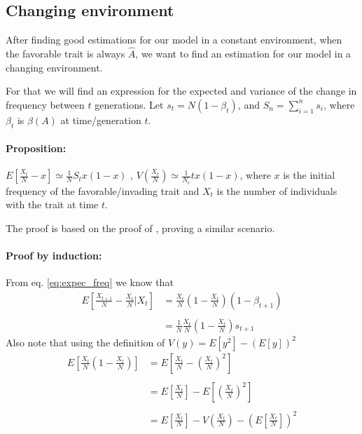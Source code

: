 \documentclass[11pt]{article}
\begin{document}
\subsection{Changing environment}
After finding good estimations for our model in a constant environment, when the favorable trait is always $\hat{A}$, we want to find an estimation for our model in a changing environment.

For that we will find an expression for the expected and variance of the change in frequency between $t$ generations.
Let $s_t=N(1-\beta_t)$, and $S_n=\sum\limits_{i=1}^n s_i$, where $\beta_t$ is $\beta(A)$ at time/generation $t$.


\paragraph{Proposition:} $E[\frac{X_t}{N}-x]\simeq \frac{1}{N}S_tx(1-x)$ , $V(\frac{X_t}{N})\simeq\frac{1}{N_e}tx(1-x)$, where $x$ is the initial frequency of the favorable/invading trait and $X_t$ is the number of individuals with the trait at time $t$.

The proof is based on the proof of \citet{changeEnv}, proving a similar scenario.
\paragraph{Proof by induction:}
From eq. \ref{eq:expec_freq} we know that
\begin{equation}\label{eq:ch_1}
\begin{split}
E\left[\frac{X_{t+1}}{N}-\frac{X_t}{N}\bigg|X_t\right] &= \frac{X_t}{N}\left(1-\frac{X_t}{N}\right)(1-\beta_{t+1}) \\\\
&= \frac{1}{N}\frac{X_t}{N}\left(1-\frac{X_t}{N}\right)s_{t+1}
\end{split}
\end{equation}
Also note that using the definition of $V(y)=E[y^2]-(E[y])^2$
\begin{equation}
\begin{split}
E\left[\frac{X_t}{N}\left(1-\frac{X_t}{N}\right)\right] &= E\left[\frac{X_t}{N}-\left(\frac{X_t}{N}\right)^2\right] \\\\
&= E\left[\frac{X_t}{N}\right]-E\left[\left(\frac{X_t}{N}\right)^2\right] \\\\
&= E\left[\frac{X_t}{N}\right] - V\left(\frac{X_t}{N}\right) - \left(E\left[\frac{X_t}{N}\right]\right)^2
\end{split}
\end{equation}
\end{document}
